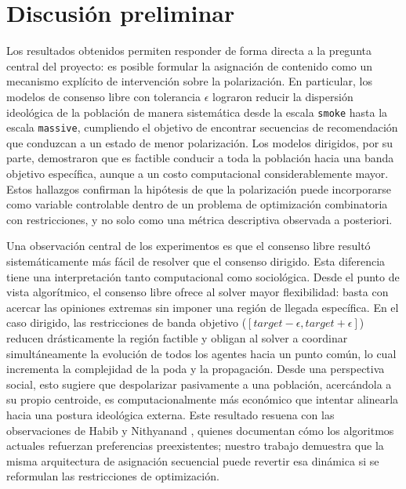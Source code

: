 \documentclass[10pt,letterpaper]{article}
\begin{document}
\section{Discusi\'on preliminar}

Los resultados obtenidos permiten responder de forma directa a la pregunta central del proyecto: es posible formular la asignaci\'on de contenido como un mecanismo expl\'icito de intervenci\'on sobre la polarizaci\'on. En particular, los modelos de consenso libre con tolerancia \(\epsilon\) lograron reducir la dispersi\'on ideol\'ogica de la poblaci\'on de manera sistem\'atica desde la escala \texttt{smoke} hasta la escala \texttt{massive}, cumpliendo el objetivo de encontrar secuencias de recomendaci\'on que conduzcan a un estado de menor polarizaci\'on. Los modelos dirigidos, por su parte, demostraron que es factible conducir a toda la poblaci\'on hacia una banda objetivo espec\'ifica, aunque a un costo computacional considerablemente mayor. Estos hallazgos confirman la hip\'otesis de que la polarizaci\'on puede incorporarse como variable controlable dentro de un problema de optimizaci\'on combinatoria con restricciones, y no solo como una m\'etrica descriptiva observada a posteriori.

Una observaci\'on central de los experimentos es que el consenso libre result\'o sistem\'aticamente m\'as f\'acil de resolver que el consenso dirigido. Esta diferencia tiene una interpretaci\'on tanto computacional como sociol\'ogica. Desde el punto de vista algor\'itmico, el consenso libre ofrece al solver mayor flexibilidad: basta con acercar las opiniones extremas sin imponer una regi\'on de llegada espec\'ifica. En el caso dirigido, las restricciones de banda objetivo (\([target - \epsilon, target + \epsilon]\)) reducen dr\'asticamente la regi\'on factible y obligan al solver a coordinar simult\'aneamente la evoluci\'on de todos los agentes hacia un punto com\'un, lo cual incrementa la complejidad de la poda y la propagaci\'on. Desde una perspectiva social, esto sugiere que despolarizar pasivamente a una poblaci\'on, acerc\'andola a su propio centroide, es computacionalmente m\'as econ\'omico que intentar alinearla hacia una postura ideol\'ogica externa. Este resultado resuena con las observaciones de Habib y Nithyanand \cite{habib2025youtube}, quienes documentan c\'omo los algoritmos actuales refuerzan preferencias preexistentes; nuestro trabajo demuestra que la misma arquitectura de asignaci\'on secuencial puede revertir esa din\'amica si se reformulan las restricciones de optimizaci\'on.
\end{document}
